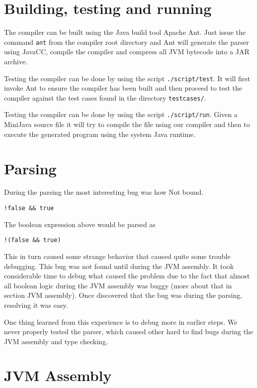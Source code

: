 \documentclass[a4paper]{article}
\begin{document}
\section{Building, testing and running}

The compiler can be built using the Java build tool Apache Ant\texttrademark.
Just issue the command \texttt{ant} from the compiler root directory and Ant
will generate the parser using JavaCC, compile the compiler and compress all JVM
bytecode into a JAR archive.

Testing the compiler can be done by using the script \texttt{./script/test}. It
will first invoke Ant to ensure the compiler has been built and then proceed to
test the compiler against the test cases found in the directory
\texttt{testcases/}.

Testing the compiler can be done by using the script \texttt{./script/run}.
Given a MiniJava source file it will try to compile the file using our compiler
and then to execute the generated program using the system Java runtime.

\appendix

\section{Parsing}

During the parsing the most interesting bug was how Not bound.

\begin{lstlisting}
!false && true
\end{lstlisting}

The boolean expression above would be parsed as

\begin{lstlisting}
!(false && true)
\end{lstlisting}

This in turn caused some strange behavior that caused quite some trouble debugging. This bug was not found until during the JVM assembly. It took considerable time to debug what caused the problem due to the fact that almost all boolean logic during the JVM assembly was buggy (more about that in section JVM assembly). Once discovered that the bug was during the parsing, resolving it was easy.

One thing learned from this experience is to debug more in earlier steps. We never properly tested the parser, which caused other hard to find bugs during the JVM assembly and type checking.

\section{JVM Assembly}
\end{document}
